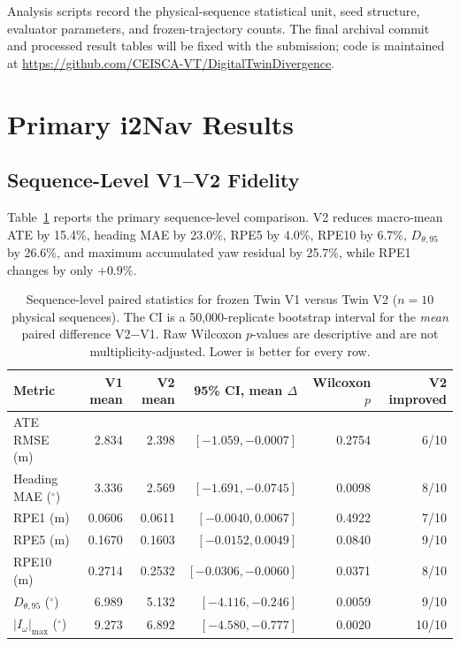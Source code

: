 \documentclass[journal]{IEEEtran}
\begin{document}
Analysis scripts record the physical-sequence statistical unit, seed structure, evaluator parameters, and frozen-trajectory counts. The final archival commit and processed result tables will be fixed with the submission; code is maintained at \url{https://github.com/CEISCA-VT/DigitalTwinDivergence}.

\section{Primary i2Nav Results}
\subsection{Sequence-Level V1--V2 Fidelity}
Table~\ref{tab:pairedstats} reports the primary sequence-level comparison. V2 reduces macro-mean ATE by 15.4\%, heading MAE by 23.0\%, RPE5 by 4.0\%, RPE10 by 6.7\%, $D_{\theta,95}$ by 26.6\%, and maximum accumulated yaw residual by 25.7\%, while RPE1 changes by only $+0.9\%$.

\begin{table}[t]
\caption{Sequence-level paired statistics for frozen Twin V1 versus Twin V2 ($n=10$ physical sequences). The CI is a 50,000-replicate bootstrap interval for the \emph{mean} paired difference V2$-$V1. Raw Wilcoxon $p$-values are descriptive and are not multiplicity-adjusted. Lower is better for every row.}
\label{tab:pairedstats}
\centering
\scriptsize
\setlength{\tabcolsep}{4.0pt}
\begin{tabular}{lrrrrr}
\toprule
Metric & V1 mean & V2 mean & 95\% CI, mean $\Delta$ & Wilcoxon $p$ & V2 improved \\
\midrule
ATE RMSE (m) & 2.834 & 2.398 & $[-1.059,-0.0007]$ & 0.2754 & 6/10 \\
Heading MAE ($^\circ$) & 3.336 & 2.569 & $[-1.691,-0.0745]$ & 0.0098 & 8/10 \\
RPE1 (m) & 0.0606 & 0.0611 & $[-0.0040,0.0067]$ & 0.4922 & 7/10 \\
RPE5 (m) & 0.1670 & 0.1603 & $[-0.0152,0.0049]$ & 0.0840 & 9/10 \\
RPE10 (m) & 0.2714 & 0.2532 & $[-0.0306,-0.0060]$ & 0.0371 & 8/10 \\
$D_{\theta,95}$ ($^\circ$) & 6.989 & 5.132 & $[-4.116,-0.246]$ & 0.0059 & 9/10 \\
$|I_\omega|_{\max}$ ($^\circ$) & 9.273 & 6.892 & $[-4.580,-0.777]$ & 0.0020 & 10/10 \\
\bottomrule
\end{tabular}
\end{table}
\end{document}
